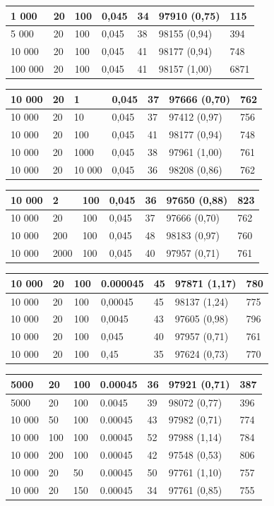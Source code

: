 \documentclass{article}
\begin{document}
\begin{description}
\begin{tabular}{|l|l|l|l||l|l|l|}
\hline
1 000 & 20 & 100 & 0,045 & 34 & 97910 (0,75) & 115\\
\hline
5 000 & 20 & 100 & 0,045 & 38 & 98155 (0,94) & 394\\
\hline
10 000 & 20 & 100 & 0,045 & 41 & 98177 (0,94) & 748\\
\hline
100 000 & 20 & 100 & 0,045 & 41 & 98157 (1,00) & 6871\\
\hline
\end{tabular}
\begin{tabular}{|l|l|l|l||l|l|l|}
\hline
10 000 & 20 & 1 & 0,045 & 37 & 97666 (0,70) & 762\\
\hline
10 000 & 20 & 10 & 0,045 & 37 & 97412 (0,97) & 756\\
\hline
10 000 & 20 & 100 & 0,045 & 41 & 98177 (0,94) & 748\\
\hline
10 000 & 20 & 1000 & 0,045 & 38 & 97961 (1,00) & 761\\
\hline
10 000 & 20 & 10 000 & 0,045 & 36 & 98208 (0,86) & 762\\
\hline
\end{tabular}
\begin{tabular}{|l|l|l|l||l|l|l|}
\hline
10 000 & 2 & 100 & 0,045 & 36 & 97650 (0,88) & 823\\
\hline
10 000 & 20 & 100 & 0,045 & 37 & 97666 (0,70) & 762\\
\hline
10 000 & 200 & 100 & 0,045 & 48 & 98183 (0,97) & 760\\
\hline
10 000 & 2000 & 100 & 0,045 & 40 & 97957 (0,71) & 761\\
\hline
\end{tabular}
\begin{tabular}{|l|l|l|l||l|l|l|}
\hline
10 000 & 20 & 100 & 0.000045 & 45 & 97871 (1,17) & 780\\
\hline
10 000 & 20 & 100 & 0,00045 & 45 & 98137 (1,24) & 775\\
\hline
10 000 & 20 & 100 & 0,0045 & 43 & 97605 (0,98) & 796\\
\hline
10 000 & 20 & 100 & 0,045 & 40 & 97957 (0,71) & 761\\
\hline
10 000 & 20 & 100 & 0,45 & 35 & 97624 (0,73) & 770\\
\hline
\end{tabular}
\begin{tabular}{|l|l|l|l||l|l|l|}
\hline
5000 & 20 & 100 & 0.00045 & 36 & 97921 (0,71) & 387\\
\hline
5000 & 20 & 100 & 0.0045 & 39 & 98072 (0,77) & 396\\
\hline
10 000 & 50 & 100 & 0.00045 & 43 & 97982 (0,71) & 774\\
\hline
10 000 & 100 & 100 & 0.00045 & 52 & 97988 (1,14) & 784\\
\hline
10 000 & 200 & 100 & 0.00045 & 42 & 97548 (0,53) & 806\\
\hline
10 000 & 20 & 50 & 0.00045 & 50 & 97761 (1,10) & 757\\
\hline
10 000 & 20 & 150 & 0.00045 & 34 & 97761 (0,85) & 755\\
\end{tabular}
\end{description}
\end{document}
